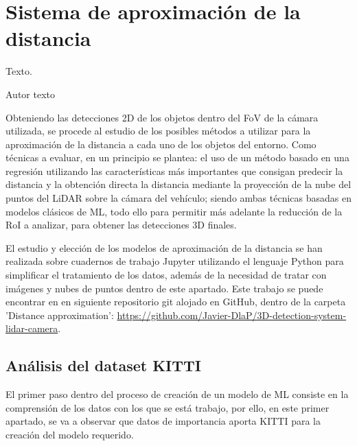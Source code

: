 \chapter{Sistema de aproximación de la distancia}
\label{cha:Sistema de aproximación de la distancia}

\begin{FraseCelebre}
  \begin{Frase}
    Texto.
  \end{Frase}
  \begin{Fuente}
    Autor texto
  \end{Fuente}
\end{FraseCelebre}

\noindent
Obteniendo las detecciones 2D de los objetos dentro del \ac{FoV} de la cámara utilizada, se procede al estudio de los posibles métodos a utilizar para la aproximación de la distancia a cada uno de los objetos del entorno. Como técnicas a evaluar, en un principio se plantea: el uso de un método basado en una regresión utilizando las características más importantes que consigan predecir la distancia y la obtención directa la distancia mediante la proyección de la nube del puntos del \ac{LiDAR} sobre la cámara del vehículo; siendo ambas técnicas basadas en modelos clásicos de \ac{ML}, todo ello para permitir más adelante la reducción de la \ac{RoI} a analizar, para obtener las detecciones 3D finales.

El estudio y elección de los modelos de aproximación de la distancia se han realizada sobre cuadernos de trabajo Jupyter utilizando el lenguaje Python para simplificar el tratamiento de los datos, además de la necesidad de tratar con imágenes y nubes de puntos dentro de este apartado. Este trabajo se puede encontrar en en siguiente repositorio git alojado en GitHub, dentro de la carpeta 'Distance approximation': \url{https://github.com/Javier-DlaP/3D-detection-system-lidar-camera}.

\section{Análisis del dataset KITTI}
\label{sec:Análisis del dataset KITTI}

El primer paso dentro del proceso de creación de un modelo de \ac{ML} consiste en la comprensión de los datos con los que se está trabajo, por ello, en este primer apartado, se va a observar que datos de importancia aporta KITTI para la creación del modelo requerido.

